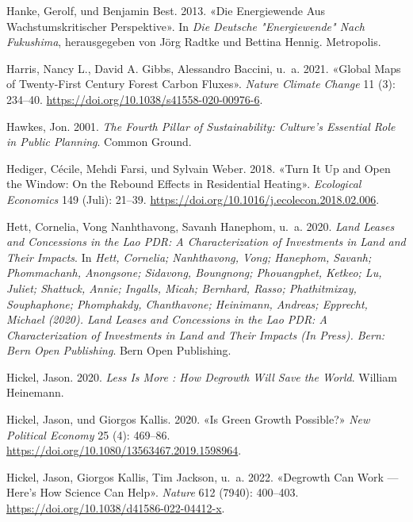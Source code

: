 \documentclass[
  nswissgerman,
  a4paper,
  openany]{book}
\newlength{\cslhangindent}
\newenvironment{CSLReferences}[2] %
 {\begin{list}{}{%
  \setlength{\itemindent}{0pt}
  \setlength{\leftmargin}{0pt}
  \setlength{\parsep}{0pt}
  \ifodd #1
   \setlength{\leftmargin}{\cslhangindent}
   \setlength{\itemindent}{-1\cslhangindent}
  \fi
  \setlength{\itemsep}{#2\baselineskip}}}
 {\end{list}}
\begin{document}
\begin{CSLReferences}{1}{1}
Hanke, Gerolf, und Benjamin Best. 2013. {«Die {Energiewende} Aus
Wachstumskritischer {Perspektive}»}. In \emph{Die Deutsche
"{Energiewende}" Nach {Fukushima}}, herausgegeben von Jörg Radtke und
Bettina Hennig. Metropolis.

{Harris, Nancy L., David A. Gibbs, Alessandro Baccini, u.~a.} 2021.
{«Global Maps of Twenty-First Century Forest Carbon Fluxes»}.
\emph{Nature Climate Change} 11 (3): 234--40.
\url{https://doi.org/10.1038/s41558-020-00976-6}.

Hawkes, Jon. 2001. \emph{The {Fourth Pillar} of {Sustainability}:
{Culture}'s {Essential Role} in {Public Planning}}. Common Ground.

Hediger, Cécile, Mehdi Farsi, und Sylvain Weber. 2018. {«Turn {It Up}
and {Open} the {Window}: {On} the {Rebound Effects} in {Residential
Heating}»}. \emph{Ecological Economics} 149 (Juli): 21--39.
\url{https://doi.org/10.1016/j.ecolecon.2018.02.006}.

Hett, Cornelia, Vong Nanhthavong, Savanh Hanephom, u.~a. 2020.
\emph{Land {Leases} and {Concessions} in the {Lao PDR}: {A}
Characterization of Investments in Land and Their Impacts}. In
\emph{Hett, Cornelia; Nanhthavong, Vong; Hanephom, Savanh; Phommachanh,
Anongsone; Sidavong, Boungnong; Phouangphet, Ketkeo; Lu, Juliet;
Shattuck, Annie; Ingalls, Micah; Bernhard, Rasso; Phathitmixay,
Souphaphone; Phomphakdy, Chanthavone; Heinimann, Andreas; Epprecht,
Michael (2020). Land Leases and Concessions in the Lao PDR: A
Characterization of Investments in Land and Their Impacts (In Press).
Bern: Bern Open Publishing}. Bern Open Publishing.

Hickel, Jason. 2020. \emph{Less Is More : How Degrowth Will Save the
World}. William Heinemann.

Hickel, Jason, und Giorgos Kallis. 2020. {«Is {Green Growth Possible}?»}
\emph{New Political Economy} 25 (4): 469--86.
\url{https://doi.org/10.1080/13563467.2019.1598964}.

Hickel, Jason, Giorgos Kallis, Tim Jackson, u.~a. 2022. {«Degrowth Can
Work --- Here's How Science Can Help»}. \emph{Nature} 612 (7940):
400--403. \url{https://doi.org/10.1038/d41586-022-04412-x}.


\end{CSLReferences}
\end{document}
